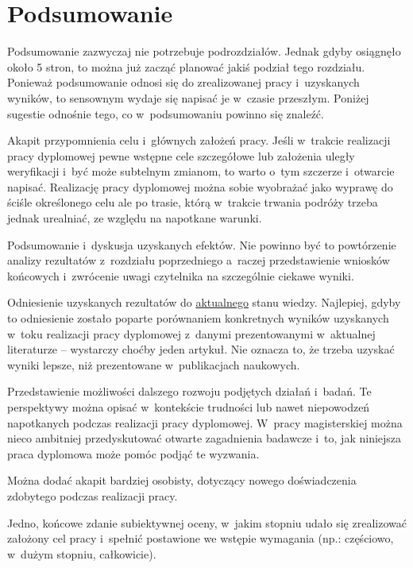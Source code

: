 \chapter{Podsumowanie}
\label{ch:podsumowanie}

Podsumowanie zazwyczaj nie potrzebuje podrozdziałów. Jednak gdyby osiągnęło około 5 stron, to można już zacząć planować jakiś podział tego rozdziału. Ponieważ podsumowanie odnosi się do zrealizowanej pracy i~uzyskanych wyników, to sensownym wydaje się napisać je w~czasie przeszłym. Poniżej sugestie odnośnie tego, co w~podsumowaniu powinno się znaleźć.

Akapit przypomnienia celu i~głównych założeń pracy. Jeśli w~trakcie realizacji pracy dyplomowej pewne wstępne cele szczegółowe lub założenia uległy weryfikacji i~być może subtelnym zmianom, to warto o~tym szczerze i~otwarcie napisać. Realizację pracy dyplomowej można sobie wyobrażać jako wyprawę do ściśle określonego celu ale po trasie, którą w~trakcie trwania podróży trzeba jednak urealniać, ze względu na napotkane warunki.

Podsumowanie i~dyskusja uzyskanych efektów. Nie powinno być to powtórzenie analizy rezultatów z~rozdziału poprzedniego a~raczej przedstawienie wniosków końcowych i~zwrócenie uwagi czytelnika na szczególnie ciekawe wyniki.

Odniesienie uzyskanych rezultatów do \underline{aktualnego} stanu wiedzy. Najlepiej, gdyby to odniesienie zostało poparte porównaniem konkretnych wyników uzyskanych w~toku realizacji pracy dyplomowej z~danymi prezentowanymi w~aktualnej literaturze -- wystarczy choćby jeden artykuł. Nie oznacza to, że trzeba uzyskać wyniki lepsze, niż prezentowane w~publikacjach naukowych.

Przedstawienie możliwości dalszego rozwoju podjętych działań i~badań. Te perspektywy można opisać w~kontekście trudności lub nawet niepowodzeń napotkanych podczas realizacji pracy dyplomowej. W~pracy magisterskiej można nieco ambitniej przedyskutować otwarte zagadnienia badawcze i~to, jak niniejsza praca dyplomowa może pomóc podjąć te wyzwania.

Można dodać akapit bardziej osobisty, dotyczący nowego doświadczenia zdobytego podczas realizacji pracy.

Jedno, końcowe zdanie subiektywnej oceny, w~jakim stopniu udało się zrealizować założony cel pracy i~spełnić postawione we wstępie wymagania (np.: częściowo, w~dużym stopniu, całkowicie).
